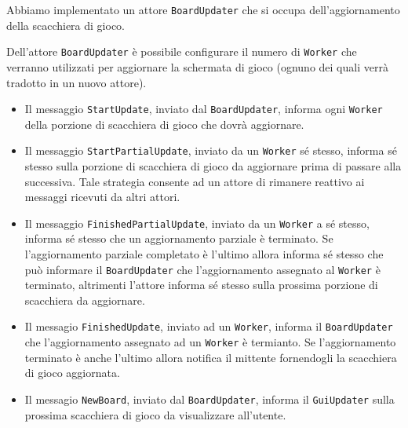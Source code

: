 \documentclass[a4paper]{report}
\begin{document}
Abbiamo implementato un attore \texttt{BoardUpdater} che si occupa dell'aggiornamento della scacchiera di gioco.

Dell'attore \texttt{BoardUpdater} è possibile configurare il numero di \texttt{Worker} che verranno utilizzati per aggiornare la schermata di gioco (ognuno dei quali verrà tradotto in un nuovo attore).

\begin{itemize}
    \item Il messaggio \texttt{StartUpdate}, inviato dal \texttt{BoardUpdater}, informa ogni \texttt{Worker} della porzione di scacchiera di gioco che dovrà aggiornare.
    \item Il messaggio \texttt{StartPartialUpdate}, inviato da un \texttt{Worker} sé stesso, informa sé stesso sulla porzione di scacchiera di gioco da aggiornare prima di passare alla successiva. Tale strategia consente ad un attore di rimanere reattivo ai messaggi ricevuti da altri attori.
    \item Il messaggio \texttt{FinishedPartialUpdate}, inviato da un \texttt{Worker} a sé stesso, informa sé stesso che un aggiornamento parziale è terminato. Se l'aggiornamento parziale completato è l'ultimo allora informa sé stesso che può informare il \texttt{BoardUpdater} che l'aggiornamento assegnato al \texttt{Worker} è terminato, altrimenti l'attore informa sé stesso sulla prossima porzione di scacchiera da aggiornare.
    \item Il messagio \texttt{FinishedUpdate}, inviato ad un \texttt{Worker}, informa il \texttt{BoardUpdater} che l'aggiornamento assegnato ad un \texttt{Worker} è termianto. Se l'aggiornamento terminato è anche l'ultimo allora notifica il mittente fornendogli la scacchiera di gioco aggiornata.
    \item Il messagio \texttt{NewBoard}, inviato dal \texttt{BoardUpdater}, informa il \texttt{GuiUpdater} sulla prossima scacchiera di gioco da visualizzare all'utente.
\end{itemize}
\end{document}
